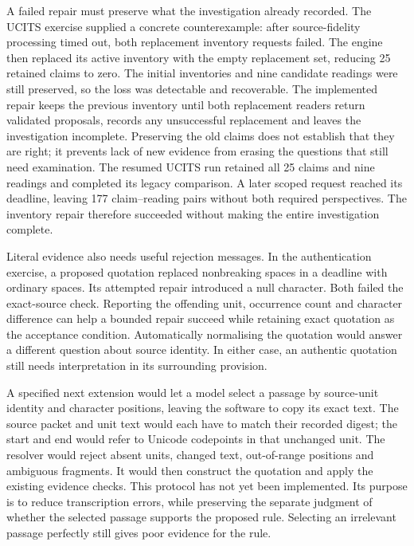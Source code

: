 \documentclass[12pt,a4paper,oneside,openany]{book}
\begin{document}
A failed repair must preserve what the investigation already recorded. The
UCITS exercise supplied a concrete counterexample: after source-fidelity
processing timed out, both replacement inventory requests failed. The engine
then replaced its active inventory with the empty replacement set, reducing
25 retained claims to zero. The initial inventories and nine candidate readings
were still preserved, so the loss was detectable and recoverable. The implemented
repair keeps the previous inventory until both replacement readers return
validated proposals, records any unsuccessful replacement and leaves the
investigation incomplete. Preserving the old claims does not establish that
they are right; it prevents lack of new evidence from erasing the questions
that still need examination. The resumed UCITS run retained all 25 claims and
nine readings and completed its legacy comparison. A later scoped request
reached its deadline, leaving 177 claim--reading pairs without both required
perspectives. The inventory repair therefore succeeded without making the
entire investigation complete.

Literal evidence also needs useful rejection messages. In the authentication
exercise, a proposed quotation replaced nonbreaking spaces in a deadline with
ordinary spaces. Its attempted repair introduced a null character. Both failed
the exact-source check. Reporting the offending unit, occurrence count and
character difference can help a bounded repair succeed while retaining exact
quotation as the acceptance condition. Automatically normalising the quotation
would answer a different question about source identity. In either case, an
authentic quotation still needs interpretation in its surrounding provision.

A specified next extension would let a model select a passage by source-unit
identity and character positions, leaving the software to copy its exact text.
The source packet and unit text would each have to match their recorded digest;
the start and end would refer to Unicode codepoints in that unchanged unit.
The resolver would reject absent units, changed text, out-of-range positions
and ambiguous fragments. It would then construct the quotation and apply the
existing evidence checks. This protocol has not yet been implemented. Its
purpose is to reduce transcription errors, while preserving the separate
judgment of whether the selected passage supports the proposed rule. Selecting
an irrelevant passage perfectly still gives poor evidence for the rule.
\end{document}
